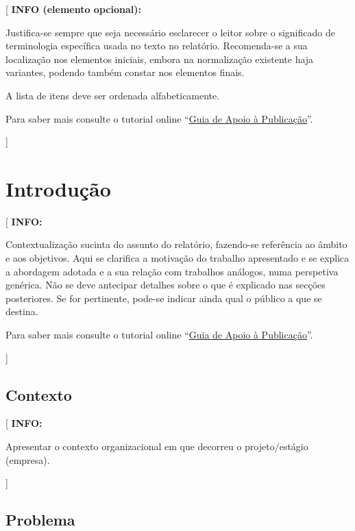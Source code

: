 \documentclass[11pt,a4paper]{report}
\newenvironment{info}[1]{\vspace*{6mm}\color{blue}
                            [ \textbf{INFO:} \begin{em} #1}
                        {\vspace*{3mm}\end{em} ]}
\newenvironment{infoopt}[1]{\vspace*{6mm}\color{blue}
                            [ \textbf{INFO (elemento opcional):} \begin{em} #1}
                        {\vspace*{3mm}\end{em} ]}
\begin{document}
\begin{infoopt}
Justifica-se sempre que seja necessário esclarecer o leitor sobre o
significado de terminologia específica usada no texto no relatório.
Recomenda-se a sua localização nos elementos iniciais, embora na
normalização existente haja variantes, podendo também constar nos
elementos finais.

A lista de itens deve ser ordenada alfabeticamente.

Para saber mais consulte o tutorial online 
``\href{https://docs.google.com/document/d/1TDC1behVq8x7fQL4CcPEEh_np5GXviJevQxnQ9gbiJs/edit}
{Guia de Apoio à Publicação}''.
\end{infoopt}


\chapter{Introdução}

\pagestyle{fancy}
\setcounter{page}{1}

\begin{info}
Contextualização sucinta do assunto do relatório, fazendo-se
referência ao âmbito e aos objetivos.
Aqui se clarifica a motivação do trabalho apresentado e se explica a
abordagem adotada e a sua relação com trabalhos análogos, numa
perspetiva genérica.
Não se deve antecipar detalhes sobre o que é explicado nas secções
posteriores. 
Se for pertinente, pode-se indicar ainda qual o público a que se
destina.

Para saber mais consulte o tutorial online 
``\href{https://docs.google.com/document/d/1TDC1behVq8x7fQL4CcPEEh_np5GXviJevQxnQ9gbiJs/edit}
{Guia de Apoio à Publicação}''.
\end{info}

\section{Contexto}

\begin{info}
Apresentar o contexto organizacional em que decorreu o projeto/estágio (empresa).
\end{info}

\section{Problema}
\end{document}
